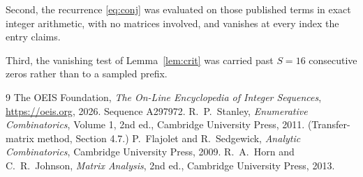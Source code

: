 \documentclass[11pt,a4paper]{article}
\theoremstyle{plain}
\theoremstyle{definition}
\begin{document}
Second, the recurrence \eqref{eq:conj} was evaluated on those published terms in exact
integer arithmetic, with no matrices involved, and vanishes at every index the entry claims.

Third, the vanishing test of Lemma~\ref{lem:crit} was carried past $S=16$ consecutive
zeros rather than to a sampled prefix.

\begin{thebibliography}{9}
 The OEIS Foundation, \emph{The On-Line Encyclopedia of Integer
Sequences}, \url{https://oeis.org}, 2026. Sequence A297972.
 R.~P.~Stanley, \emph{Enumerative Combinatorics}, Volume 1, 2nd ed.,
Cambridge University Press, 2011. (Transfer-matrix method, Section 4.7.)
 P.~Flajolet and R.~Sedgewick, \emph{Analytic Combinatorics}, Cambridge
University Press, 2009.
 R.~A.~Horn and C.~R.~Johnson, \emph{Matrix Analysis}, 2nd ed., Cambridge
University Press, 2013.
\end{thebibliography}
\end{document}
